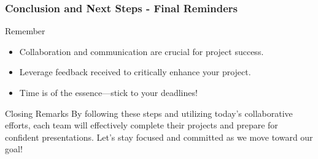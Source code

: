 \documentclass{beamer}
\begin{document}
\begin{frame}[fragile]
    \frametitle{Conclusion and Next Steps - Final Reminders}
    \begin{block}{Remember}
        \begin{itemize}
            \item Collaboration and communication are crucial for project success.
            \item Leverage feedback received to critically enhance your project.
            \item Time is of the essence—stick to your deadlines!
        \end{itemize}
    \end{block}
    
    \begin{block}{Closing Remarks}
        By following these steps and utilizing today’s collaborative efforts, each team will effectively complete their projects and prepare for confident presentations. Let’s stay focused and committed as we move toward our goal!
    \end{block}
\end{frame}
\end{document}
